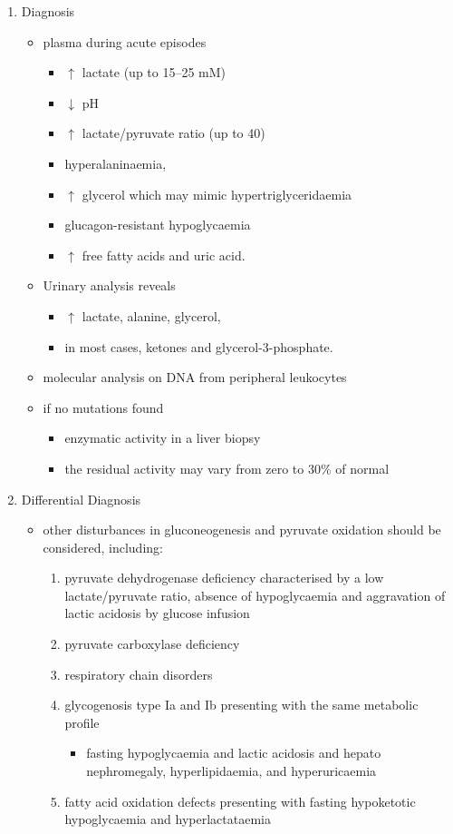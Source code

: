 \documentclass{scrartcl}
\begin{document}
\begin{enumerate}
\item Diagnosis
\label{sec:org6283db7}
\begin{itemize}
\item plasma during acute episodes
\begin{itemize}
\item \(\uparrow\) lactate (up to 15–25 mM)
\item \(\downarrow\) pH
\item \(\uparrow\) lactate/pyruvate ratio (up to 40)
\item hyperalaninaemia,
\item \(\uparrow\) glycerol which may mimic hypertriglyceridaemia
\item glucagon-resistant hypoglycaemia
\item \(\uparrow\) free fatty acids and uric acid.
\end{itemize}
\item Urinary analysis reveals
\begin{itemize}
\item \(\uparrow\) lactate, alanine, glycerol,
\item in most cases, ketones and glycerol-3-phosphate.
\end{itemize}

\item molecular analysis on DNA from peripheral leukocytes
\item if no mutations found
\begin{itemize}
\item enzymatic activity in a liver biopsy
\item the residual activity may vary from zero to 30\% of normal
\end{itemize}
\end{itemize}

\item Differential Diagnosis
\label{sec:orgb4a981b}
\begin{itemize}
\item other disturbances in gluconeogenesis and pyruvate oxidation should be considered, including:
\begin{enumerate}
\item pyruvate dehydrogenase deficiency characterised by a low
lactate/pyruvate ratio, absence of hypoglycaemia and aggravation
of lactic acidosis by glucose infusion
\item pyruvate carboxylase deficiency
\item respiratory chain disorders
\item glycogenosis type Ia and Ib presenting with the same metabolic profile
\begin{itemize}
\item fasting hypoglycaemia and lactic acidosis and hepato nephromegaly, hyperlipidaemia, and hyperuricaemia
\end{itemize}
\item fatty acid oxidation defects presenting with fasting hypoketotic hypoglycaemia and hyperlactataemia
\end{enumerate}
\end{itemize}


\end{enumerate}
\end{document}
